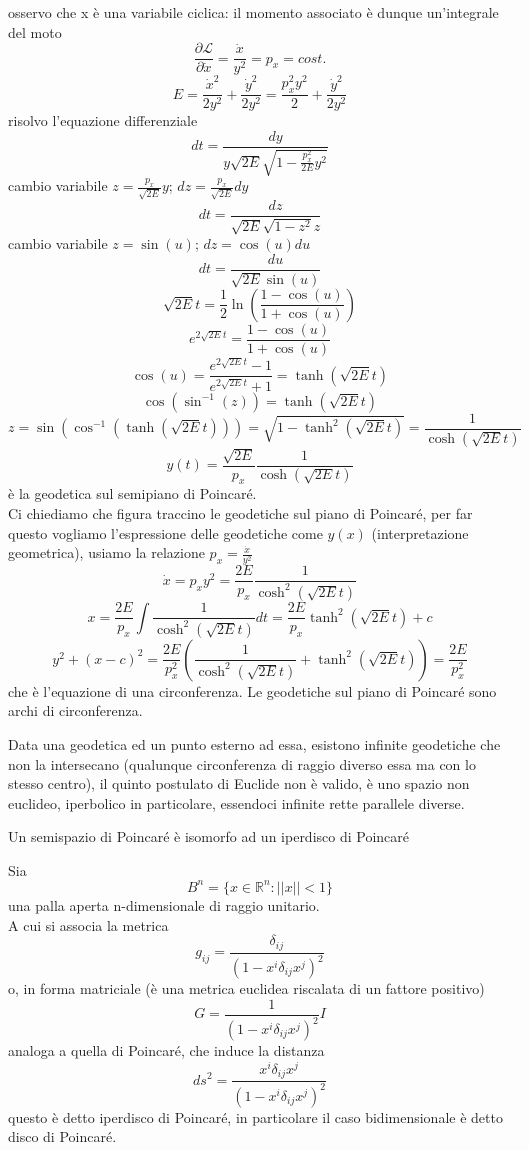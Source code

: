 \documentclass[
10pt, %
a4paper, %
oneside, %
headinclude,footinclude, %
BCOR5mm, %
]{scrartcl}
\begin{document}
osservo che x è una variabile ciclica: il momento associato è dunque un'integrale del moto
\[\frac{\partial \mathcal{L}}{\partial \dot{x}} = \frac{\dot{x}}{y^2} = p_x= cost.\]
\[E = \frac{\dot{x}^2}{2y^2}+\frac{\dot{y}^2}{2y^2} = \frac{p_x^2y^2}{2}+\frac{\dot{y}^2}{2y^2}\]
risolvo l'equazione differenziale 
\[dt = \frac{dy}{y\sqrt{2E}\sqrt{1-\frac{p_x^2}{2E}y^2}}\]
cambio variabile \(z = \frac{p_x}{\sqrt{2E}}y\); \(dz = \frac{p_x}{\sqrt{2E}}dy\)
\[dt = \frac{dz}{\sqrt{2E}\sqrt{1-z^2}z}\]
cambio variabile \(z = \sin(u)\); \(dz = \cos(u)du\)
\[dt = \frac{du}{\sqrt{2E}\sin (u)}\]
\[\sqrt{2E}t = \frac{1}{2}\ln\left(\frac{1-\cos(u)}{1+\cos(u)}\right)\]
\[e^{2\sqrt{2E}t} = \frac{1-\cos(u)}{1+\cos(u)}\]
\[\cos(u) = \frac{e^{2\sqrt{2E}t}-1}{e^{2\sqrt{2E}t}+1} =\tanh(\sqrt{2E}t)\]
\[\cos(\sin^{-1}(z)) = \tanh(\sqrt{2E}t)\]
\[z = \sin(\cos^{-1}(\tanh(\sqrt{2E}t))) = \sqrt{1-\tanh^2(\sqrt{2E}t)} = \frac{1}{\cosh(\sqrt{2E}t)}\]
\[y(t) = \frac{\sqrt{2E}}{p_x}\frac{1}{\cosh(\sqrt{2E}t)}\]
è la geodetica sul semipiano di Poincaré.\\
Ci chiediamo che figura traccino le geodetiche sul piano di Poincaré, per far questo vogliamo l'espressione delle geodetiche come \(y(x)\) (interpretazione geometrica), usiamo la relazione \(p_x = \frac{\dot{x}}{y^2}\)
\[\dot{x} = p_x y^2 = \frac{2E}{p_x}\frac{1}{\cosh^2(\sqrt{2E}t)}\]
\[x = \frac{2E}{p_x}\int\frac{1}{\cosh^2(\sqrt{2E}t)}dt=\frac{2E}{p_x}\tanh^2(\sqrt{2E}t)+c\]
\[y^2+(x-c)^2 = \frac{2E}{p_x^2}\left(\frac{1}{\cosh^2(\sqrt{2E}t)}+\tanh^2(\sqrt{2E}t)\right) = \frac{2E}{p_x^2}\]
che è l'equazione di una circonferenza. Le geodetiche sul piano di Poincaré sono archi di circonferenza.\\
\begin{osservazione}
	Data una geodetica ed un punto esterno ad essa, esistono infinite geodetiche che non la intersecano (qualunque circonferenza di raggio diverso essa ma con lo stesso centro), il quinto postulato di Euclide non è valido, è uno spazio non euclideo, iperbolico in particolare, essendoci infinite rette parallele diverse.
\end{osservazione}
Un semispazio di Poincaré è isomorfo ad un iperdisco di Poincaré
\begin{definizione}
	Sia
	\[B^n = \{x\in\mathbb{R}^n: ||x||<1\}\]
	una palla aperta n-dimensionale di raggio unitario.\\
	A cui si associa la metrica
	\[g_{ij} = \frac{\delta_{ij}}{(1-x^i\delta_{ij} x^j)^2}\]
	o, in forma matriciale (è una metrica euclidea riscalata di un fattore positivo)
	\[G = \frac{1}{(1-x^i\delta_{ij} x^j)^2}I\]
	analoga a quella di Poincaré, che induce la distanza
	\[ds^2 = \frac{x^i\delta_{ij}x^j}{(1-x^i\delta_{ij} x^j)^2}\]
	questo è detto iperdisco di Poincaré, in particolare il caso bidimensionale è detto disco di Poincaré.
\end{definizione}
\end{document}
